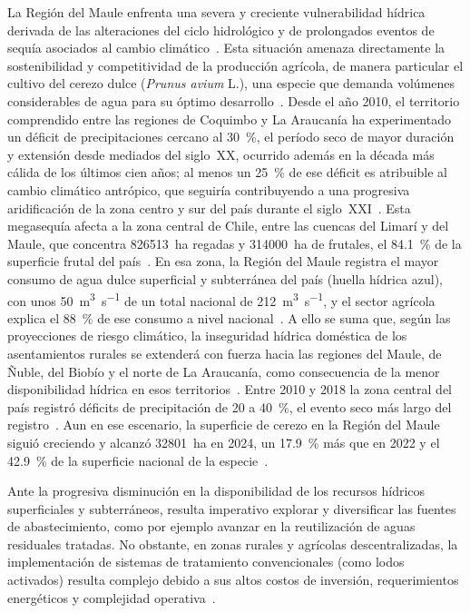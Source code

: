 La Región del Maule enfrenta una severa y creciente vulnerabilidad hídrica derivada de las alteraciones del ciclo hidrológico y de prolongados eventos de sequía asociados al cambio climático~\parencite{cr22015megasequia,garreaud2020central}.
Esta situación amenaza directamente la sostenibilidad y competitividad de la producción agrícola, de manera particular el cultivo del cerezo dulce (\textit{Prunus avium} L.), una especie que demanda volúmenes considerables de agua para su óptimo desarrollo~\parencite{allen1998crop}.
Desde el año 2010, el territorio comprendido entre las regiones de Coquimbo y La Araucanía ha experimentado un déficit de precipitaciones cercano al \qty{30}{\percent}, el período seco de mayor duración y extensión desde mediados del siglo~XX, ocurrido además en la década más cálida de los últimos cien años; al menos un \qty{25}{\percent} de ese déficit es atribuible al cambio climático antrópico, que seguiría contribuyendo a una progresiva aridificación de la zona centro y sur del país durante el siglo~XXI~\parencite{cr22015megasequia}.
Esta megasequía afecta a la zona central de Chile, entre las cuencas del Limarí y del Maule, que concentra \num{826513}~ha regadas y \num{314000}~ha de frutales, el \qty{84.1}{\percent} de la superficie frutal del país~\parencite{yaksic2024megasequia}.
En esa zona, la Región del Maule registra el mayor consumo de agua dulce superficial y subterránea del país (huella hídrica azul), con unos \qty{50}{\cubic\meter\per\second} de un total nacional de \qty{212}{\cubic\meter\per\second}, y el sector agrícola explica el \qty{88}{\percent} de ese consumo a nivel nacional~\parencite{eh20302018radiografia}.
A ello se suma que, según las proyecciones de riesgo climático, la inseguridad hídrica doméstica de los asentamientos rurales se extenderá con fuerza hacia las regiones del Maule, de Ñuble, del Biobío y el norte de La Araucanía, como consecuencia de la menor disponibilidad hídrica en esos territorios~\parencite{urquiza2020arclim}.
Entre 2010 y 2018 la zona central del país registró déficits de precipitación de 20 a \qty{40}{\percent}, el evento seco más largo del registro~\parencite{garreaud2020central}.
Aun en ese escenario, la superficie de cerezo en la Región del Maule siguió creciendo y alcanzó \qty{32801}{ha} en 2024, un \qty{17.9}{\percent} más que en 2022 y el \qty{42.9}{\percent} de la superficie nacional de la especie~\parencite{odepa2024catastro}.

Ante la progresiva disminución en la disponibilidad de los recursos hídricos superficiales y subterráneos, resulta imperativo explorar y diversificar las fuentes de abastecimiento, como por ejemplo avanzar en la reutilización de aguas residuales tratadas.
No obstante, en zonas rurales y agrícolas descentralizadas, la implementación de sistemas de tratamiento convencionales (como lodos activados) resulta complejo debido a sus altos costos de inversión, requerimientos energéticos y complejidad operativa~\parencite{tchobanoglous2014wastewater}.

